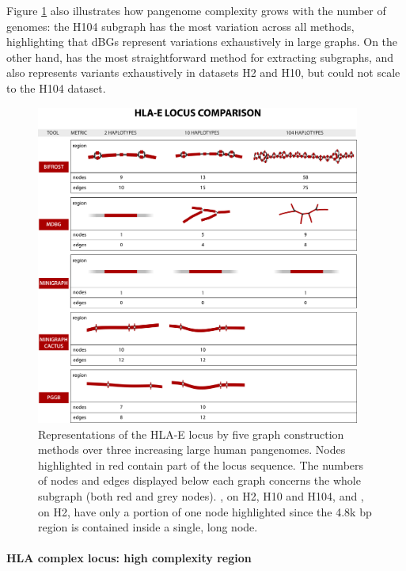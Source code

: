 Figure \ref{fig:HLA-E} also illustrates how pangenome complexity grows with the number of genomes: the \bifrost H104 subgraph has the most variation across all methods, highlighting that dBGs represent variations exhaustively in large graphs. On the other hand, \pggb has the most straightforward method for extracting subgraphs, and also represents variants exhaustively in datasets H2 and H10, but could not scale to the H104 dataset.

\begin{figure}[htp]
	\centering
	\includegraphics[width=0.95\textwidth]{figures/paperI/hla-e_corrected.pdf}
	\caption[Representations of the HLA-E locus on large human pangenomes.]{Representations of the HLA-E locus by five graph construction methods over three increasing large human pangenomes. Nodes highlighted in red contain part of the locus sequence. The numbers of nodes and edges displayed below each graph concerns the whole subgraph (both red and grey nodes). %
		\minigraph, on H2, H10 and H104, and \mdbg, on H2, have only a portion of one node highlighted since the 4.8k bp region is contained inside a single, long node.} 
	\label{fig:HLA-E}
\end{figure}

\paragraph{\textbf{\textup{HLA complex locus: high complexity region}}}

